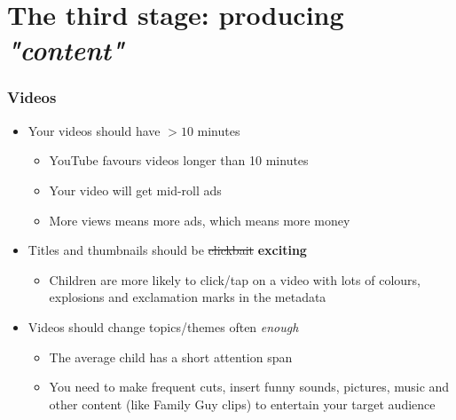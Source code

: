 \documentclass{beamer}
\begin{document}
\section{The third stage: producing \textit{"content"}}
\begin{frame}
	\frametitle{Videos}

	\begin{itemize}
		\item Your videos should have $>10$ minutes
		      \begin{itemize}
			      \item YouTube favours videos longer than 10 minutes
			      \item Your video will get mid-roll ads
			      \item More views means more ads, which means more money
		      \end{itemize}
		\item Titles and thumbnails should be \sout{clickbait} \textbf{exciting}
		      \begin{itemize}
			      \item Children are more likely to click/tap on a video with lots of colours,
			            explosions and exclamation marks in the metadata
		      \end{itemize}
		\item Videos should change topics/themes often \textit{enough}
		      \begin{itemize}
			      \item The average child has a short attention span
			      \item You need to make frequent cuts, insert funny sounds, pictures, music and other
			            content (like Family Guy clips) to entertain your target audience
		      \end{itemize}
	\end{itemize}
\end{frame}
\end{document}
